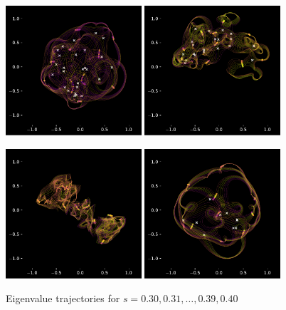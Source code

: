 \documentclass{article}
\begin{document}
	\newpage

	\begin{figure}[htbp]
		\centering
		\includegraphics[width=0.45\textwidth]{figures/N10Circle03to04.pdf}
		\includegraphics[width=0.45\textwidth]{figures/N10Meander03to04.pdf}

		\includegraphics[width=0.45\textwidth]{figures/N10Crossing03to04.pdf}
		\includegraphics[width=0.45\textwidth]{figures/N10Circle03to04B.pdf}
		\caption{Eigenvalue trajectories for $s= 0.30, 0.31, \dots , 0.39, 0.40$ }
		\label{fig:pdf_image}
	\end{figure}
\end{document}
